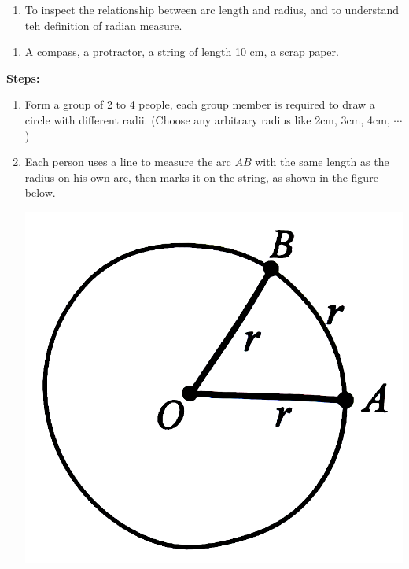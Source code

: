 \documentclass{report}
\begin{document}
\begin{explore}

    \begin{enumerate}[label=\textbf{Aim:} ,leftmargin=4.5em]
        \item To inspect the relationship between arc length and radius, and to understand teh definition of radian measure.
    \end{enumerate}
    \vspace{-2em}
    \begin{enumerate}[label=\textbf{Materials Needed:} ,leftmargin=2em, align=left]
        \item A compass, a protractor, a string of length 10 cm, a scrap paper.
    \end{enumerate}
    \vspace{-1em}

    \textbf{Steps:}
    \vspace{-1em}
    \begin{enumerate}
        \item Form a group of 2 to 4 people, each group member is required to draw a circle with different radii. (Choose any arbitrary radius like 2cm, 3cm, 4cm, $\cdots$)
        
        \item Each person uses a line to measure the arc $AB$ with the same length as the radius on his own arc, then marks it on the string, as shown in the figure below.
        
        \begin{center}
            \includegraphics[scale=0.1]{assets/8-3.png}
        \end{center}
        

\end{enumerate}
\end{explore}
\end{document}

